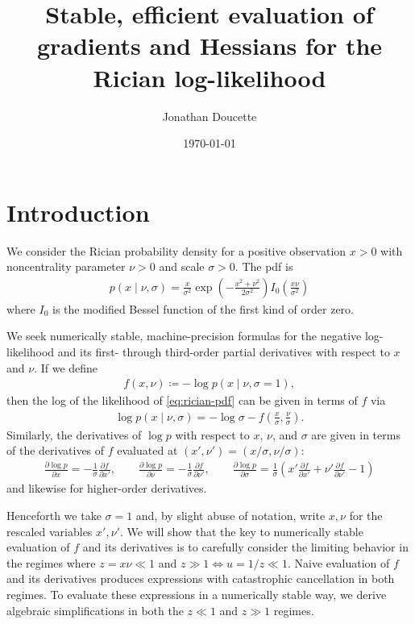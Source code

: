 \documentclass{article}
\title{Stable, efficient evaluation of gradients and Hessians for the Rician log-likelihood}
\author{Jonathan Doucette}
\date{\today}
\begin{document}
\maketitle

\section{Introduction}

We consider the Rician probability density for a positive observation $x>0$ with noncentrality parameter $\nu>0$ and scale $\sigma>0$.
The pdf is
%
\begin{align}
  p(x \mid \nu, \sigma) = \frac{x}{\sigma^2} \exp\left(-\frac{x^2+\nu^2}{2\sigma^2}\right) I_0\left(\frac{x\nu}{\sigma^2}\right) \label{eq:rician-pdf}
\end{align}
%
where $I_0$ is the modified Bessel function of the first kind of order zero.

We seek numerically stable, machine-precision formulas for the negative log-likelihood and its first- through third-order partial derivatives with respect to $x$ and $\nu$.
If we define
%
\begin{align}
  f(x, \nu) \coloneqq -\log p(x \mid \nu, \sigma = 1),
\end{align}
%
then the log of the likelihood of \cref{eq:rician-pdf} can be given in terms of $f$ via
%
\begin{align}
  \log p(x \mid \nu, \sigma) = -\log\sigma - f\left(\frac{x}{\sigma}, \frac{\nu}{\sigma}\right).
\end{align}
%
Similarly, the derivatives of $\log p$ with respect to $x$, $\nu$, and $\sigma$ are given in terms of the derivatives of $f$ evaluated at $(x', \nu') = (x / \sigma, \nu / \sigma)$:
%
\begin{align}
  \frac{\partial \log p}{\partial x}      = -\frac{1}{\sigma} \frac{\partial f}{\partial x'},                                                                                        \qquad
  \frac{\partial \log p}{\partial \nu}    = -\frac{1}{\sigma} \frac{\partial f}{\partial \nu'},                                                                                      \qquad
  \frac{\partial \log p}{\partial \sigma} = \frac{1}{\sigma} \left( x' \frac{\partial f}{\partial x'} + \nu' \frac{\partial f}{\partial \nu'} - 1 \right)
\end{align}
%
and likewise for higher-order derivatives.

Henceforth we take $\sigma=1$ and, by slight abuse of notation, write $x, \nu$ for the rescaled variables $x', \nu'$.
We will show that the key to numerically stable evaluation of $f$ and its derivatives is to carefully consider the limiting behavior in the regimes where $z = x\nu \ll 1$ and $z \gg 1 \Leftrightarrow u=1/z \ll 1$.
Naive evaluation of $f$ and its derivatives produces expressions with catastrophic cancellation in both regimes.
To evaluate these expressions in a numerically stable way, we derive algebraic simplifications in both the $z \ll 1$ and $z \gg 1$ regimes.
\end{document}
